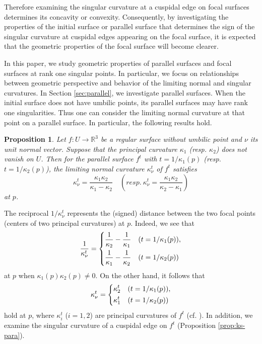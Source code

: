 \documentclass[11pt,a4paper,pdflatex,final]{amsart}
\theoremstyle{plain}
\newtheorem{proposition}[theorem]{Proposition}%
\theoremstyle{definition}
\theoremstyle{remark}
\newcommand{\0}{\bm{0}}
\newcommand{\R}{\mathbb{R}}
\numberwithin{equation}{section}
\begin{document}
Therefore examining the singular curvature 
at a cuspidal edge on focal surfaces 
determines its concavity or convexity. 
Consequently, by investigating the properties of the initial surface or parallel surface 
that determines the sign of the singular curvature at cuspidal edges appearing on the focal surface, 
it is expected that the geometric properties of the focal surface will become clearer.

In this paper, we study geometric properties of parallel surfaces 
and focal surfaces at rank one singular points. 
In particular, we focus on relationships 
between geometric perspective and 
behavior of the limiting normal and singular curvatures. 
In Section \ref{sec:parallel}, 
we investigate parallel surfaces. 
When the initial surface does not have umbilic points, 
its parallel surfaces may have rank one singularities. 
Thus one can consider the limiting normal curvature at that point 
on a parallel surface. 
In particular, the following results hold.
\begin{proposition}\label{prop:kn-para}
	Let $f\colon U\to\R^3$ be a regular surface without umbilic point 
	and $\nu$ its unit normal vector. 
	Suppose that the principal curvature $\kappa_1$ \textup{(}resp. $\kappa_2$\textup{)}
	does not vanish on $U$. 
	{Then for the parallel surface $f^{t}$ with $t=1/\kappa_1(p)$ \textup{(}resp. $t=1/\kappa_2(p)$\textup{)},} 
	the limiting normal curvature 
	$\kappa_\nu^{t}$ of $f^t$ satisfies 
	\[
	\kappa_\nu^t=\frac{\kappa_1\kappa_2}{\kappa_1-\kappa_2}\quad 
	\left(\textit{resp.}~\kappa_\nu^t=\frac{\kappa_1\kappa_2}{\kappa_2-\kappa_1}\right)
	\]
	at $p$. 
\end{proposition}
The reciprocal $1/\kappa_\nu^t$ represents the (signed) distance between the two focal points 
(centers of two principal curvatures) at $p$. 
Indeed, we see that 
\[
\frac{1}{\kappa_\nu^t}=
\begin{dcases}
	\frac{1}{\kappa_2}-\frac{1}{\kappa_1} & (t=1/\kappa_1(p)),\\
	\frac{1}{\kappa_1}-\frac{1}{\kappa_2} & (t=1/\kappa_2(p))
\end{dcases}
\]
at $p$ when $\kappa_1(p)\kappa_2(p)\neq0$. 
On the other hand, it follows that 
\[
\kappa_\nu^t=
\begin{dcases}
	\kappa_2^t & (t=1/\kappa_1(p)),\\
	\kappa_1^t & (t=1/\kappa_2(p))
\end{dcases}
\]
hold at $p$, where $\kappa_i^t$ ($i=1,2$) are principal curvatures of $f^t$ (cf. \cite{tera1}). 
In addition, we examine the singular curvature of a cuspidal edge on $f^t$ 
(Proposition \ref{prop:ks-para}). 
\end{document}
